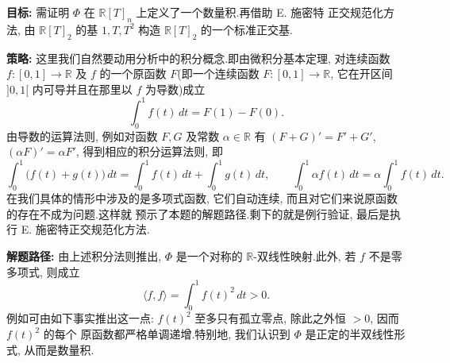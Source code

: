 \noindent\textbf{目标:} 需证明 $\varPhi$ 在 $\mathbb{R}[T]_n$ 上定义了一个数量积.再借助 E. 施密特
正交规范化方法, 由 $\mathbb{R}[T]_2$ 的基 $1, T, T^2$ 构造 $\mathbb{R}[T]_2$ 的一个标准正交基.

\noindent\textbf{策略:} 这里我们自然要动用分析中的积分概念.即由微积分基本定理, 对连续函数
$f \colon [0, 1] \longrightarrow \mathbb{R}$ 及 $f$ 的一个原函数 $F$(即一个连续函数
$F \colon [0, 1] \longrightarrow \mathbb{R}$, 它在开区间 $]0, 1[$ 内可导并且在那里以 $f$ 为导数)成立
\[
\int_0^1 f(t)\, dt = F(1) - F(0)\text{.}
\]
由导数的运算法则, 例如对函数 $F, G$ 及常数 $\alpha \in \mathbb{R}$ 有
$(F + G)' = F' + G'$, $(\alpha F)' = \alpha F'$, 得到相应的积分运算法则, 即
\[
\int_0^1 \bigl(f(t) + g(t)\bigr)\, dt = \int_0^1 f(t)\, dt + \int_0^1 g(t)\, dt, \qquad
\int_0^1 \alpha f(t)\, dt = \alpha \int_0^1 f(t)\, dt\text{.}
\]
在我们具体的情形中涉及的是多项式函数, 它们自动连续, 而且对它们来说原函数的存在不成为问题.这样就
预示了本题的解题路径.剩下的就是例行验证, 最后是执行 E. 施密特正交规范化方法.

\noindent\textbf{解题路径:} 由上述积分法则推出, $\varPhi$ 是一个对称的 $\mathbb{R}$-双线性映射.此外,
若 $f$ 不是零多项式, 则成立
\[
\langle f, f \rangle = \int_0^1 f(t)^2\, dt > 0\text{.}
\]
例如可由如下事实推出这一点: $f(t)^2$ 至多只有孤立零点, 除此之外恒 $> 0$, 因而 $f(t)^2$ 的每个
原函数都严格单调递增.特别地, 我们认识到 $\varPhi$ 是正定的半双线性形式, 从而是数量积.

